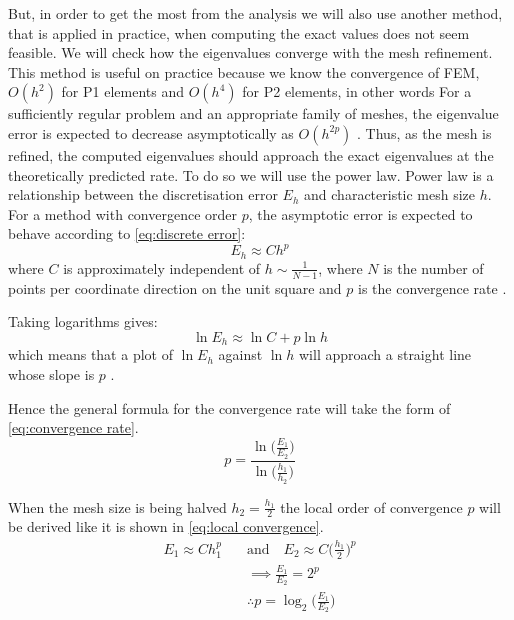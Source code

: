 \documentclass[conference]{IEEEtran}
\begin{document}
But, in order to get the most from the analysis we will also use another method, that is applied in practice, when computing the exact values does not seem feasible. We will check how the eigenvalues converge with the mesh refinement.
This method is useful on practice because we know the convergence of FEM, $O(h^2)$ for P1 elements and $O(h^4)$ for P2 elements, in other words For a sufficiently regular problem and an appropriate family of meshes, the eigenvalue error is expected to decrease asymptotically as $O(h^{2p})$ \cite{b12.4}. Thus, as the mesh is refined, the computed eigenvalues should approach the exact eigenvalues at the theoretically predicted rate.
To do so we will use the power law. Power law is a relationship between the discretisation error $E_h$ and characteristic mesh size $h$. For a method with convergence order $p$, the asymptotic error is expected to behave according to \ref{eq:discrete error}:
\begin{equation}
    E_h \approx Ch^{p}
    \label{eq:discrete error}
\end{equation}
where $C$ is approximately independent of $h \sim \frac{1}{N - 1}$, where $N$ is the number of points per coordinate direction on the unit square and $p$ is the convergence rate \cite{b12.4}. 

Taking logarithms gives:
\begin{equation}
    \ln E_h \approx \ln C + p\ln h
\end{equation} 
which means that a plot of $\ln E_h$ against $\ln h$ will approach a straight line whose slope is $p$ \cite{b26}.

Hence the general formula for the convergence rate will take the form of \ref{eq:convergence rate}.
\begin{equation}
    p = \frac{\ln\Big(\frac{E_1}{E_2}\Big)}{\ln\Big(\frac{h_1}{h_2}\Big)}
    \label{eq:convergence rate}
\end{equation}

When the mesh size is being halved $h_2 = \frac{h_1}{2}$ the local order of convergence $p$ will be derived like it is shown in \ref{eq:local convergence}.
\begin{equation}
\begin{aligned}
    E_1 \approx Ch_1^p &\quad\text{and}\quad E_2 \approx C\Bigg(\frac{h_1}{2}\Bigg)^p \\
    &\quad \implies \frac{E_1}{E_2} = 2^p \\
    &\quad \therefore p = \log_2\Bigg(\frac{E_1}{E_2}\Bigg)
    \label{eq:local convergence}
\end{aligned}
\end{equation}
\end{document}
